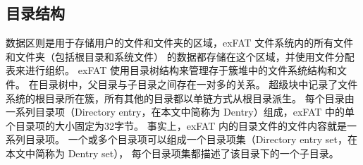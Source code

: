 \subsection{目录结构}\label{subsec:dentry}
数据区则是用于存储用户的文件和文件夹的区域，exFAT 文件系统内的所有文件和文件夹（包括根目录和系统文件）
的数据都存储在这个区域，并使用文件分配表来进行组织。
exFAT 使用目录树结构\parencite{al-turany2019understanding}来管理存于簇堆中的文件系统结构和文件。
在目录树中，父目录与子目录之间存在一对多的关系。
超级块中记录了文件系统的根目录所在簇，所有其他的目录都以单链方式从根目录派生。
每个目录由一系列目录项（Directory entry，在本文中简称为 Dentry）\parencite{wang2020research}组成，exFAT 中的单个目录项的大小固定为32字节。
事实上，exFAT 内的目录文件的文件内容就是一系列目录项。
一个或多个目录项可以组成一个目录项集（Directory entry set，在本文中简称为 Dentry set），
每个目录项集都描述了该目录下的一个子目录。


